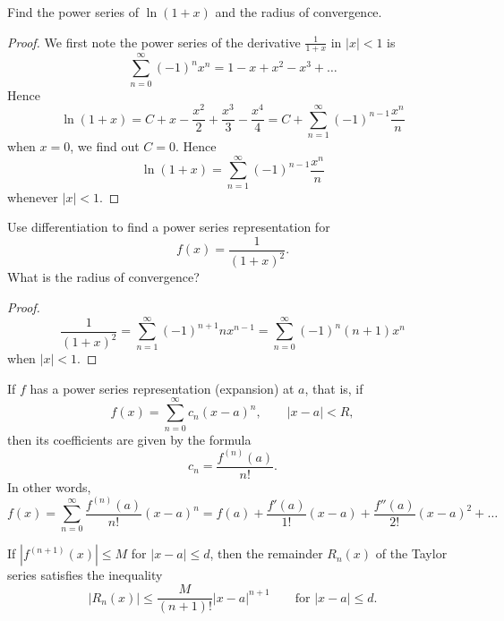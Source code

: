 \documentclass[openany]{book}
\begin{document}
\begin{prob}
    Find the power series of $\ln(1+x)$ and the radius of convergence.
\end{prob}
\begin{proof}
    We first note the power series of the derivative $\frac{1}{1+x}$ in $|x|<1$ is 
    \begin{equation*}
        \sum_{n=0}^\infty(-1)^nx^n=1-x+x^2-x^3+\dots
    \end{equation*}
    Hence 
    \begin{equation*}
        \ln(1+x)=C+x-\frac{x^2}{2}+\frac{x^3}{3}-\frac{x^4}{4}=C+\sum_{n=1}^\infty(-1)^{n-1}\frac{x^n}{n}
    \end{equation*}
    when $x=0$, we find out $C=0$. Hence 
    \begin{equation*}
        \ln(1+x)=\sum_{n=1}^\infty(-1)^{n-1}\frac{x^n}{n}
    \end{equation*}
    whenever $|x|<1$.
\end{proof}







\begin{prob}
   Use differentiation to find a power series representation for
        \[
        f(x) = \frac{1}{(1+x)^2}.
        \]
        What is the radius of convergence?
\end{prob}
\begin{proof}
    \begin{equation*}
        \frac{1}{(1+x)^2}=\sum_{n=1}^\infty(-1)^{n+1}nx^{n-1}=\sum_{n=0}^\infty(-1)^n(n+1)x^n
    \end{equation*}
    when $|x|<1$.
\end{proof}




\begin{prop}
    If $f$ has a power series representation (expansion) at $a$,
that is, if
\[
f(x) = \sum_{n=0}^{\infty} c_n(x-a)^n,
\qquad |x-a| < R,
\]
then its coefficients are given by the formula
\[
c_n = \frac{f^{(n)}(a)}{n!}.
\]
In other words, 
\begin{equation*}
    f(x)
= \sum_{n=0}^{\infty}
\frac{f^{(n)}(a)}{n!}(x-a)^n=f(a)
+ \frac{f'(a)}{1!}(x-a)
+ \frac{f''(a)}{2!}(x-a)^2+\dots
\end{equation*}
\end{prop}



\begin{prop}
    If $|f^{(n+1)}(x)| \leq M$ for $|x-a| \leq d$,
then the remainder $R_n(x)$ of the Taylor
series satisfies the inequality
\[
|R_n(x)|
\leq \frac{M}{(n+1)!}|x-a|^{n+1}
\qquad \text{for } |x-a| \leq d.
\]
\end{prop}
\end{document}
